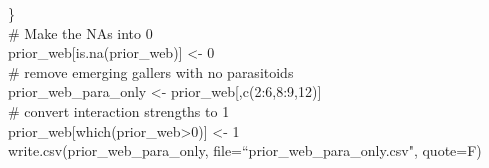 \documentclass[12pt]{article}
\begin{document}
\begin{em}
      \}\\
      \vspace{4pt}
      \noindent \hspace{2pt}\# Make the NAs into 0\\
      \noindent \hspace{2pt}prior\_web[is.na(prior\_web)] \textless- 0\\
      \vspace{4pt}
      \noindent \hspace{2pt}\# remove emerging gallers with no parasitoids\\
      \noindent \hspace{2pt}prior\_web\_para\_only \textless- prior\_web[,c(2:6,8:9,12)]\\
      \vspace{4pt}
      \noindent \hspace{2pt}\# convert interaction strengths to 1\\
      \noindent \hspace{2pt}prior\_web[which(prior\_web\textgreater0)] \textless- 1\\
      \noindent \hspace{2pt}write.csv(prior\_web\_para\_only, file=``prior\_web\_para\_only.csv", quote=F)\\
      \end{em}



        
\end{document}
